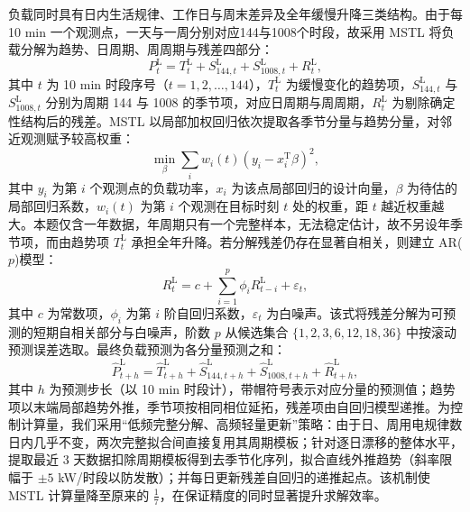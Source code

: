 \documentclass[withoutpreface,bwprint]{cumcmthesis}
\begin{document}
负载同时具有日内生活规律、工作日与周末差异及全年缓慢升降三类结构。由于每 10 min 一个观测点，一天与一周分别对应144与1008个时段，故采用 MSTL 将负载分解为趋势、日周期、周周期与残差四部分：
\vspace*{-7pt}
\begin{equation}
	P^{\mathrm{L}}_{t}=T^{\mathrm{L}}_{t}+S^{\mathrm{L}}_{144,t}+S^{\mathrm{L}}_{1008,t}+R^{\mathrm{L}}_{t},
	\label{eq:q2mstl}
\end{equation}
其中 $t$ 为 10 min 时段序号（$t=1,2,\dots,144$），$T^{\mathrm{L}}_t$ 为缓慢变化的趋势项，$S^{\mathrm{L}}_{144,t}$ 与 $S^{\mathrm{L}}_{1008,t}$ 分别为周期 144 与 1008 的季节项，对应日周期与周周期，$R^{\mathrm{L}}_t$ 为剔除确定性结构后的残差。MSTL 以局部加权回归依次提取各季节分量与趋势分量，对邻近观测赋予较高权重：
\begin{equation}
	\min_{\beta}\sum_i w_i(t)\left(y_i-x_i^{\mathrm{T}}\beta\right)^2,
	\label{eq:q2loess}
\end{equation}
其中 $y_i$ 为第 $i$ 个观测点的负载功率，$x_i$ 为该点局部回归的设计向量，$\beta$ 为待估的局部回归系数，$w_i(t)$ 为第 $i$ 个观测在目标时刻 $t$ 处的权重，距 $t$ 越近权重越大。本题仅含一年数据，年周期只有一个完整样本，无法稳定估计，故不另设年季节项，而由趋势项 $T^{\mathrm{L}}_t$ 承担全年升降。若分解残差仍存在显著自相关，则建立 AR($p$)模型：
\vspace*{-7pt}
\begin{equation}
	R^{\mathrm{L}}_{t}=c+\sum_{i=1}^{p}\phi_i R^{\mathrm{L}}_{t-i}+\varepsilon_t,
	\label{eq:q2arL}
\end{equation}
其中 $c$ 为常数项，$\phi_i$ 为第 $i$ 阶自回归系数，$\varepsilon_t$ 为白噪声。该式将残差分解为可预测的短期自相关部分与白噪声，阶数 $p$ 从候选集合 $\{1,2,3,6,12,18,36\}$ 中按滚动预测误差选取。最终负载预测为各分量预测之和：
\begin{equation}
	\hat P^{\mathrm{L}}_{t+h}=\hat T^{\mathrm{L}}_{t+h}+\hat S^{\mathrm{L}}_{144,t+h}+\hat S^{\mathrm{L}}_{1008,t+h}+\hat R^{\mathrm{L}}_{t+h},
	\label{eq:q2loadpred}
\end{equation}
其中 $h$ 为预测步长（以 10 min 时段计），带帽符号表示对应分量的预测值；趋势项以末端局部趋势外推，季节项按相同相位延拓，残差项由自回归模型递推。为控制计算量，我们采用“低频完整分解、高频轻量更新”策略：由于日、周用电规律数日内几乎不变，两次完整拟合间直接复用其周期模板；针对逐日漂移的整体水平，提取最近 3 天数据扣除周期模板得到去季节化序列，拟合直线外推趋势（斜率限幅于 $\pm5$ kW/时段以防发散）；并每日更新残差自回归的递推起点。该机制使 MSTL 计算量降至原来的 $\frac{1}{7}$，在保证精度的同时显著提升求解效率。
\end{document}
